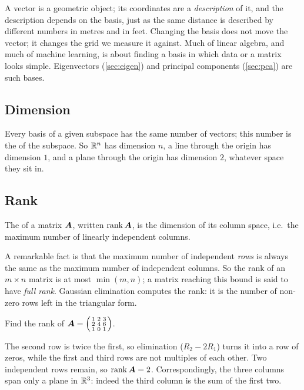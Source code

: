 \begin{intuition}
A vector is a geometric object; its coordinates are a \emph{description} of it,
and the description depends on the basis, just as the same distance is
described by different numbers in metres and in feet. Changing the basis does
not move the vector; it changes the grid we measure it against. Much of linear
algebra, and much of machine learning, is about finding a basis in which data
or a matrix looks simple. Eigenvectors (\cref{sec:eigen}) and principal
components (\cref{sec:pca}) are such bases.
\end{intuition}

\subsection{Dimension}

Every basis of a given subspace has the same number of vectors; this number is
the  of the subspace. So $\mathbb{R}^n$ has dimension $n$, a line
through the origin has dimension $1$, and a plane through the origin has
dimension $2$, whatever space they sit in.

\subsection{Rank}

\begin{definition}[Rank]\label{def:rank}
The  of a matrix $\bm{A}$, written $\operatorname{rank}\bm{A}$, is the dimension of its
column space, i.e.\ the maximum number of linearly independent columns.
\end{definition}

A remarkable fact is that the maximum number of independent \emph{rows} is
always the same as the maximum number of independent columns. So the rank of
an $m\times n$ matrix is at most $\min(m, n)$; a matrix reaching this bound is
said to have \emph{full rank}. Gaussian elimination computes the rank: it is
the number of non-zero rows left in the triangular form.

\begin{example}
Find the rank of $\bm{A} = \left(\begin{smallmatrix} 1 & 2 & 3\\ 2 & 4 & 6\\ 1 & 0 &
1\end{smallmatrix}\right)$.

\sol The second row is twice the first, so elimination ($R_2 - 2R_1$) turns it
into a row of zeros, while the first and third rows are not multiples of each
other. Two independent rows remain, so $\operatorname{rank}\bm{A} = 2$. Correspondingly, the
three columns span only a plane in $\mathbb{R}^3$: indeed the third column is the sum
of the first two.
\end{example}

